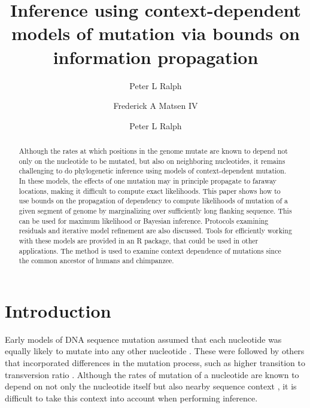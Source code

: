 \documentclass{article}
\theoremstyle{plain}
\theoremstyle{definition}
\begin{document}


\title{Inference using context-dependent models of mutation via bounds on information propagation}
\author[1]{Peter L Ralph}
\author[2,3,4,5]{Frederick A Matsen IV}
\author[1,*]{Peter L Ralph}



\maketitle

\begin{abstract}
    Although the rates at which positions in the genome mutate
    are known to depend not only on the nucleotide to be mutated,
    but also on neighboring nucleotides,
    it remains challenging to do phylogenetic inference
    using models of context-dependent mutation.
    In these models,
    the effects of one mutation may in principle propagate
    to faraway locations,
    making it difficult to compute exact likelihoods.
    This paper shows how to use bounds on the propagation of dependency
    to compute likelihoods of mutation of a given segment of genome
    by marginalizing over sufficiently long flanking sequence.
    This can be used for maximum likelihood or Bayesian inference.
    Protocols examining residuals and iterative model refinement
    are also discussed.
    Tools for efficiently working with these models
    are provided in an R package,
    that could be used in other applications.
    The method is used to examine context dependence of mutations
    since the common ancestor of humans and chimpanzee.
\end{abstract}

\section*{Introduction}

Early models of DNA sequence mutation
assumed that each nucleotide was equally likely to mutate
into any other nucleotide \citep{jukes1969evolution}.
These were followed by others that incorporated differences
in the mutation process, such as higher transition to transversion ratio
\citep{hasegawa1985dating,felsenstein1996hidden}.
Although the rates of mutation of a nucleotide
are known to depend on not only the nucleotide itself
but also nearby sequence context \citep{seplyarskiy2021population},
it is difficult to take this context into account when performing inference.
\end{document}
